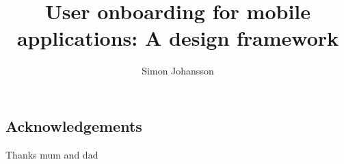 \documentclass[a4paper, 11pt, twoside]{report}
\title{User onboarding for mobile applications: A design framework}
\author{Simon Johansson}
\begin{document}
\maketitle


\begin{center}
\section*{Acknowledgements}
Thanks mum and dad 
\end{center}

\clearpage

\end{document}
